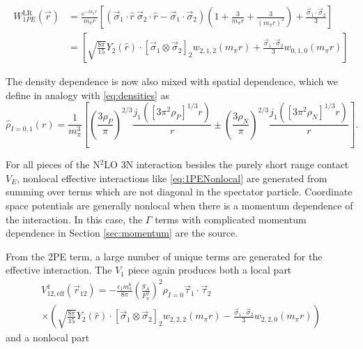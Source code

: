 \documentclass[%
 preprint,
 amsmath,amssymb,
 aps,
]{revtex4-1}
\newcommand{\rot}{\vec{r}_{12}}
\newcommand{\taudot}{\vec{\tau}_1\cdot\vec{\tau}_2}
\newcommand{\sigmadot}{\vec{\sigma}_1\cdot\vec{\sigma}_2}
\newcommand{\sigmatwo}{[\vec{\sigma}_1\otimes\vec{\sigma}_2]_2}
\newcommand{\w}[4]{w_{#1,#2,#3}(#4)}
\begin{document}
\begin{equation}\begin{split}
W^{\text{LR}}_{1PE}(\vec{r})&=\frac{e^{-m_\pi r}}{m_\pi r}\left[\left(\vec{\sigma}_1\cdot\hat{r}\:\vec{\sigma}_2\cdot\hat{r}-\sigmadot\right)\left(1+\frac{3}{m_\pi r}+\frac{3}{(m_\pi r)^2}\right)+\frac{\sigmadot}{3}\right] \\
&=\left[\sqrt{\frac{8\pi}{15}}Y_2(\hat{r})\cdot\sigmatwo\w{2}{1}{2}{m_\pi r}+\frac{\sigmadot}{3}\w{0}{1}{0}{m_\pi r}\right]
\end{split}
\end{equation}

The density dependence is now also mixed with spatial dependence, which we define in analogy with \eqref{eq:densities} as 
\begin{equation}\label{eq:hatdensities}
\hat{\rho}_{I=0,1}(r)=%
\frac{1}{m_\pi^3}\left[ \left(\frac{3 \rho_P}{\pi}\right)^{2/3} \frac{ j_1( [3\pi^2 \rho_P]^{1/3}  r)}{ r} \pm \left(\frac{3 \rho_N}{\pi}\right)^{2/3} \frac{ j_1( [3\pi^2 \rho_N]^{1/3}  r)}{ r} \right].
\end{equation}

For all pieces of the N$^2$LO 3N interaction besides the purely short range contact $V_E$, nonlocal effective interactions like \eqref{eq:1PENonlocal} are generated from summing over terms which are not diagonal in the spectator particle. Coordinate space potentials are generally nonlocal when there is a momentum dependence of the interaction. In this case, the $\Gamma$ terms with complicated momentum dependence in Section \ref{sec:momentum} are the source.

From the 2PE term, a large number of unique terms are generated for the effective interaction. The $V_1$ piece again produces both a local part 
\begin{multline}
V^{1}_{12,\text{eff}}(\rot)=-\frac{c_1 m_\pi^6}{8\pi}\left(\frac{g_A}{F_\pi^2}\right)^2 \rho_{I=0}\taudot\:\\
 \times\left(\sqrt{\frac{8\pi}{15}}Y_2(\hat{r})\cdot\sigmatwo \w{2}{2}{2}{m_\pi r} -\frac{\sigmadot}{3}  \w{2}{2}{0}{m_\pi r} \right)
\end{multline}
and a nonlocal part 
\end{document}
